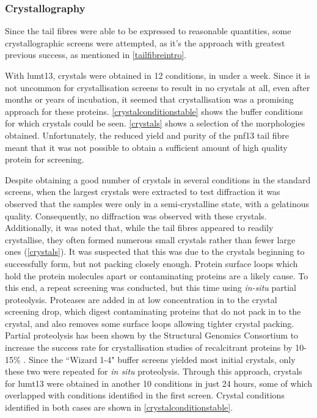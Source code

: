 \subsubsection{Crystallography}
Since the tail fibres were able to be expressed to reasonable quantities, some crystallographic screens were attempted, as it's the approach with greatest previous success, as mentioned in \vref{tailfibreintro}.

With lumt13, crystals were obtained in 12 conditions, in under a week. Since it is not uncommon for crystallisation screens to result in no crystals at all, even after months or years of incubation, it seemed that crystallisation was a promising approach for these proteins. \vref{crystalconditionstable} shows the buffer conditions for which crystals could be seen. \vref{crystals} shows a selection of the morphologies obtained. Unfortunately, the reduced yield and purity of the pnf13 tail fibre meant that it was not possible to obtain a sufficient amount of high quality protein for screening.


Despite obtaining a good number of crystals in several conditions in the standard screens, when the largest crystals were extracted to test diffraction it was observed that the samples were only in a semi-crystalline state, with a gelatinous quality. Consequently, no diffraction was observed with these crystals. Additionally, it was noted that, while the tail fibres appeared to readily crystallise, they often formed numerous small crystals rather than fewer large ones (\vref{crystals}). It was suspected that this was due to the crystals beginning to successfully form, but not packing closely enough. Protein surface loops which hold the protein molecules apart or contaminating proteins are a likely cause. To this end, a repeat screening was conducted, but this time using \emph{in-situ} partial proteolysis. Proteases are added in at low concentration in to the crystal screening drop, which digest contaminating proteins that do not pack in to the crystal, and also removes some surface loops allowing tighter crystal packing. Partial proteolysis has been shown by the Structural Genomics Consortium to increase the success rate for crystallisation studies of recalcitrant proteins by 10-15\% \citep{Dong2007a, Wernimont2009}. Since the ``Wizard 1-4" buffer screens yielded most initial crystals, only these two were repeated for \emph{in situ} proteolysis. Through this approach, crystals for lumt13 were obtained in another 10 conditions in just 24 hours, some of which overlapped with conditions identified in the first screen. Crystal conditions identified in both cases are shown in \vref{crystalconditionstable}.

